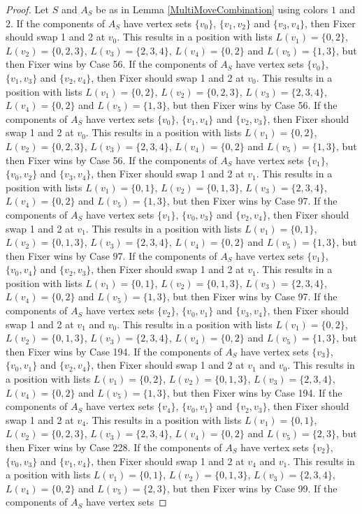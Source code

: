\documentclass[12pt]{amsart}
\theoremstyle{plain}
\theoremstyle{definition}
\theoremstyle{remark}
\begin{document}
\begin{proof}
Let $S$ and $A_S$ be as in Lemma \ref{MultiMoveCombination} using colors $1$ and $2$. If the components of $A_S$ have vertex sets $\{v_0\}$, $\{v_1, v_2\}$ and $\{v_3, v_4\}$, then Fixer should swap 1 and 2 at $v_0$. This results in a position with lists $L(v_1) = \{0, 2\}$, $L(v_2) = \{0, 2, 3\}$, $L(v_3) = \{2, 3, 4\}$, $L(v_4) = \{0, 2\}$ and $L(v_5) = \{1, 3\}$, but then Fixer wins by Case 56. If the components of $A_S$ have vertex sets $\{v_0\}$, $\{v_1, v_3\}$ and $\{v_2, v_4\}$, then Fixer should swap 1 and 2 at $v_0$. This results in a position with lists $L(v_1) = \{0, 2\}$, $L(v_2) = \{0, 2, 3\}$, $L(v_3) = \{2, 3, 4\}$, $L(v_4) = \{0, 2\}$ and $L(v_5) = \{1, 3\}$, but then Fixer wins by Case 56. If the components of $A_S$ have vertex sets $\{v_0\}$, $\{v_1, v_4\}$ and $\{v_2, v_3\}$, then Fixer should swap 1 and 2 at $v_0$. This results in a position with lists $L(v_1) = \{0, 2\}$, $L(v_2) = \{0, 2, 3\}$, $L(v_3) = \{2, 3, 4\}$, $L(v_4) = \{0, 2\}$ and $L(v_5) = \{1, 3\}$, but then Fixer wins by Case 56. If the components of $A_S$ have vertex sets $\{v_1\}$, $\{v_0, v_2\}$ and $\{v_3, v_4\}$, then Fixer should swap 1 and 2 at $v_1$. This results in a position with lists $L(v_1) = \{0, 1\}$, $L(v_2) = \{0, 1, 3\}$, $L(v_3) = \{2, 3, 4\}$, $L(v_4) = \{0, 2\}$ and $L(v_5) = \{1, 3\}$, but then Fixer wins by Case 97. If the components of $A_S$ have vertex sets $\{v_1\}$, $\{v_0, v_3\}$ and $\{v_2, v_4\}$, then Fixer should swap 1 and 2 at $v_1$. This results in a position with lists $L(v_1) = \{0, 1\}$, $L(v_2) = \{0, 1, 3\}$, $L(v_3) = \{2, 3, 4\}$, $L(v_4) = \{0, 2\}$ and $L(v_5) = \{1, 3\}$, but then Fixer wins by Case 97. If the components of $A_S$ have vertex sets $\{v_1\}$, $\{v_0, v_4\}$ and $\{v_2, v_3\}$, then Fixer should swap 1 and 2 at $v_1$. This results in a position with lists $L(v_1) = \{0, 1\}$, $L(v_2) = \{0, 1, 3\}$, $L(v_3) = \{2, 3, 4\}$, $L(v_4) = \{0, 2\}$ and $L(v_5) = \{1, 3\}$, but then Fixer wins by Case 97. If the components of $A_S$ have vertex sets $\{v_2\}$, $\{v_0, v_1\}$ and $\{v_3, v_4\}$, then Fixer should swap 1 and 2 at $v_1$ and $v_0$. This results in a position with lists $L(v_1) = \{0, 2\}$, $L(v_2) = \{0, 1, 3\}$, $L(v_3) = \{2, 3, 4\}$, $L(v_4) = \{0, 2\}$ and $L(v_5) = \{1, 3\}$, but then Fixer wins by Case 194. If the components of $A_S$ have vertex sets $\{v_3\}$, $\{v_0, v_1\}$ and $\{v_2, v_4\}$, then Fixer should swap 1 and 2 at $v_1$ and $v_0$. This results in a position with lists $L(v_1) = \{0, 2\}$, $L(v_2) = \{0, 1, 3\}$, $L(v_3) = \{2, 3, 4\}$, $L(v_4) = \{0, 2\}$ and $L(v_5) = \{1, 3\}$, but then Fixer wins by Case 194. If the components of $A_S$ have vertex sets $\{v_4\}$, $\{v_0, v_1\}$ and $\{v_2, v_3\}$, then Fixer should swap 1 and 2 at $v_4$. This results in a position with lists $L(v_1) = \{0, 1\}$, $L(v_2) = \{0, 2, 3\}$, $L(v_3) = \{2, 3, 4\}$, $L(v_4) = \{0, 2\}$ and $L(v_5) = \{2, 3\}$, but then Fixer wins by Case 228. If the components of $A_S$ have vertex sets $\{v_2\}$, $\{v_0, v_3\}$ and $\{v_1, v_4\}$, then Fixer should swap 1 and 2 at $v_4$ and $v_1$. This results in a position with lists $L(v_1) = \{0, 1\}$, $L(v_2) = \{0, 1, 3\}$, $L(v_3) = \{2, 3, 4\}$, $L(v_4) = \{0, 2\}$ and $L(v_5) = \{2, 3\}$, but then Fixer wins by Case 99. If the components of $A_S$ have vertex sets 
\end{proof}
\end{document}
